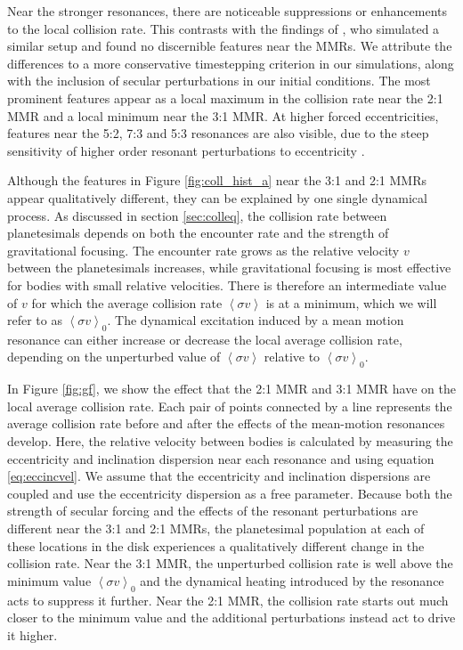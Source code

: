 Near the stronger resonances, there are noticeable suppressions or enhancements to the local collision rate. This contrasts with 
the findings of \cite{richardson00}, who simulated a similar setup and found no discernible features near the MMRs. We attribute 
the differences to a more conservative timestepping criterion in our simulations, along with the inclusion of secular perturbations 
in our initial conditions. The most prominent features appear as a local maximum in the collision rate near the 2:1 MMR and a 
local minimum near the 3:1 MMR. At higher forced eccentricities, features near the 5:2, 7:3 and 5:3 resonances are also visible, 
due to the steep sensitivity of higher order resonant perturbations to eccentricity \cite{malhotra94}.

Although the features in Figure \ref{fig:coll_hist_a} near the 3:1 and 2:1 MMRs appear qualitatively different, they can be 
explained by one single dynamical process. As discussed in section \ref{sec:colleq}, the collision rate between planetesimals 
depends on both the encounter rate and the strength of gravitational focusing. The encounter rate grows as the relative velocity 
$v$ between the planetesimals increases, while gravitational focusing is most effective for bodies with small relative velocities. 
There is therefore an intermediate value of $v$ for which the average collision rate $\left< \sigma v \right>$ is at a minimum, 
which we will refer to as  $\left< \sigma v \right>_{0}$. The dynamical excitation induced by a mean motion resonance can either 
increase or decrease the local average collision rate, depending on the unperturbed value of  $\left< \sigma v \right>$ relative to  
$\left< \sigma v \right>_{0}$.

In Figure \ref{fig:gf}, we show the effect that the 2:1 MMR and 3:1 MMR have on the local average collision rate. Each pair of 
points connected by a line represents the average collision rate before and after the effects of the mean-motion resonances 
develop. Here, the relative velocity between bodies is calculated by measuring the eccentricity and inclination dispersion near 
each resonance and using equation \ref{eq:eccincvel}. We assume that the eccentricity and inclination dispersions are coupled 
\cite{ida93a} and use the eccentricity dispersion as a free parameter. Because both the strength of secular forcing and the 
effects of the resonant perturbations are different near the 3:1 and 2:1 MMRs, the planetesimal population at each of these 
locations in the disk experiences a qualitatively different change in the collision rate. Near the 3:1 MMR, the unperturbed collision 
rate is well above the minimum value $\left< \sigma v \right>_{0}$ and the dynamical heating introduced by the resonance acts 
to suppress it further. Near the 2:1 MMR, the collision rate starts out much closer to the minimum value and the additional 
perturbations instead act to drive it higher.

